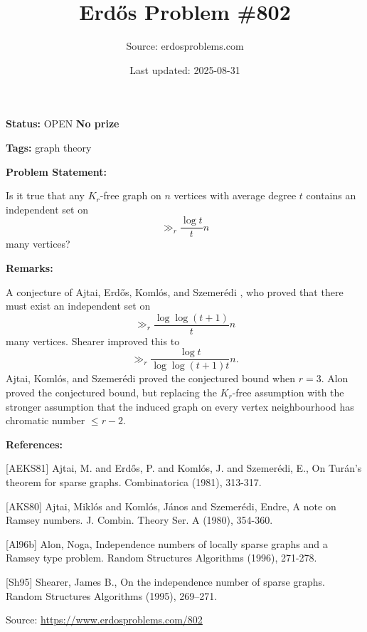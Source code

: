 \documentclass{article}
\title{Erd\H{o}s Problem \#802}
\date{Last updated: 2025-08-31}
\author{Source: erdosproblems.com}
\begin{document}
\maketitle

\noindent\textbf{Status:} OPEN \quad \textbf{No prize}

\noindent\textbf{Tags:} graph theory

\medskip
\noindent\textbf{Problem Statement:}

Is it true that any $K_r$-free graph on $n$ vertices with average degree $t$ contains an independent set on\[\gg_r \frac{\log t}{t}n\]many vertices?

\bigskip
\noindent\textbf{Remarks:}

A conjecture of Ajtai, Erd\H{o}s, Koml\'{o}s, and Szemer\'{e}di \cite{AEKS81}, who proved that there must exist an independent set on\[\gg_r \frac{\log\log(t+1)}{t}n\]many vertices. Shearer \cite{Sh95} improved this to\[\gg_r \frac{\log t}{\log\log(t+1)t}n.\]Ajtai, Koml\'{o}s, and Szemer\'{e}di \cite{AKS80} proved the conjectured bound when $r=3$. Alon \cite{Al96b} proved the conjectured bound, but replacing the $K_r$-free assumption with the stronger assumption that the induced graph on every vertex neighbourhood has chromatic number $\leq r-2$.

\bigskip
\noindent\textbf{References:}

[AEKS81] Ajtai, M. and Erd\H{o}s, P. and Koml\'{o}s, J. and Szemer\'{e}di,
E., On Tur\'{a}n's theorem for sparse graphs. Combinatorica (1981), 313-317.
 
 [AKS80] Ajtai, Mikl\'{o}s and Koml\'{o}s, J\'{a}nos and Szemer\'{e}di, Endre, A note on Ramsey numbers. J. Combin. Theory Ser. A (1980), 354-360.
 
 [Al96b] Alon, Noga, Independence numbers of locally sparse graphs and a Ramsey
type problem. Random Structures Algorithms (1996), 271-278.
 
 [Sh95] Shearer, James B., On the independence number of sparse graphs. Random Structures Algorithms (1995), 269--271.

\bigskip
\noindent\small{Source: \url{https://www.erdosproblems.com/802}}
\end{document}
